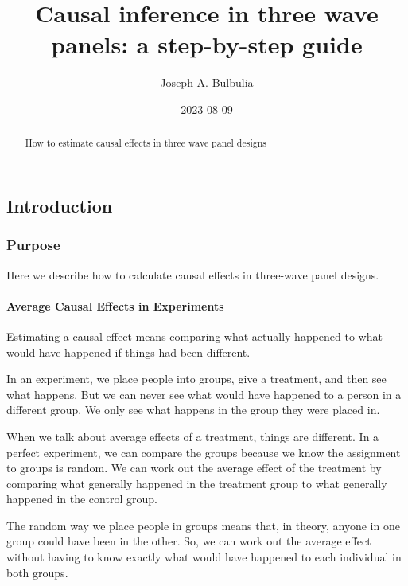 \documentclass[
  singlecolumn]{article}
\title{Causal inference in three wave panels: a step-by-step guide}
\author{Joseph A. Bulbulia}
\affil{%
                  Victoria University of Wellington, New Zealand, School
                  of Psychology, Centre for Applied Cross-Cultural
                  Research
              }
\date{2023-08-09}
\let\oldparagraph\paragraph
\renewcommand{\paragraph}[1]{\oldparagraph{#1}\mbox{}}
\begin{document}
\maketitle
\begin{abstract}
How to estimate causal effects in three wave panel designs
\end{abstract}
\ifdefined\Shaded\renewenvironment{Shaded}{\begin{tcolorbox}[borderline west={3pt}{0pt}{shadecolor}, sharp corners, interior hidden, boxrule=0pt, breakable, enhanced, frame hidden]}{\end{tcolorbox}}\fi

\hypertarget{introduction}{%
\subsection{Introduction}\label{introduction}}

\hypertarget{purpose}{%
\subsubsection{Purpose}\label{purpose}}

Here we describe how to calculate causal effects in three-wave panel
designs.

\hypertarget{average-causal-effects-in-experiments}{%
\paragraph{\texorpdfstring{\textbf{Average Causal Effects in
Experiments}}{Average Causal Effects in Experiments}}\label{average-causal-effects-in-experiments}}

Estimating a causal effect means comparing what actually happened to
what would have happened if things had been different.

In an experiment, we place people into groups, give a treatment, and
then see what happens. But we can never see what would have happened to
a person in a different group. We only see what happens in the group
they were placed in.

When we talk about average effects of a treatment, things are different.
In a perfect experiment, we can compare the groups because we know the
assignment to groups is random. We can work out the average effect of
the treatment by comparing what generally happened in the treatment
group to what generally happened in the control group.

The random way we place people in groups means that, in theory, anyone
in one group could have been in the other. So, we can work out the
average effect without having to know exactly what would have happened
to each individual in both groups.
\end{document}
